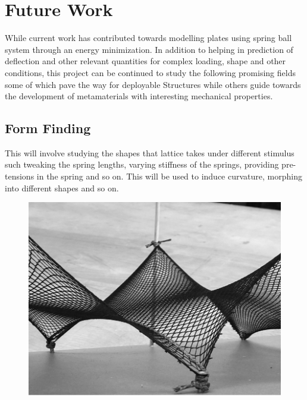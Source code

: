 \chapter{Future Work}

While current work has contributed towards modelling plates using spring ball system through an energy minimization. In addition to helping in prediction of deflection and other relevant quantities for complex loading, shape and other conditions, this project can be continued to study the following promising fields some of which pave the way for deployable Structures while others guide towards the development of metamaterials with interesting mechanical properties.

\section{Form Finding}
This will involve studying the shapes that lattice takes under different stimulus such tweaking the spring lengths, varying stiffness of the springs, providing pre-tensions in the spring and so on. This will be used to induce curvature, morphing into different shapes and so on.\cite{DU2020103370}\cite{Jones_2015}

\begin{figure}[!htbp]
    \centering
    \includegraphics[width = 1\textwidth]{Figures/form_finding.png}
\end{figure}

